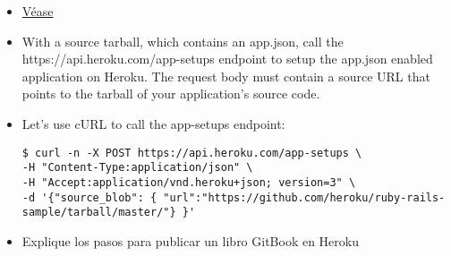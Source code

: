 \begin{itemize}
\item
  \href{https://devcenter.heroku.com/articles/setting-up-apps-using-the-heroku-platform-api\#creating-an-app-setup}{Véase}
\item
  With a source tarball, which contains an app.json, call the
  https://api.heroku.com/app-setups endpoint to setup the app.json
  enabled application on Heroku. The request body must contain a source
  URL that points to the tarball of your application's source code.
\item
  Let's use cURL to call the app-setups endpoint:

\begin{verbatim}
$ curl -n -X POST https://api.heroku.com/app-setups \
-H "Content-Type:application/json" \
-H "Accept:application/vnd.heroku+json; version=3" \
-d '{"source_blob": { "url":"https://github.com/heroku/ruby-rails-sample/tarball/master/"} }'
\end{verbatim}
\item
  Explique los pasos para publicar un libro GitBook en Heroku
\end{itemize}
